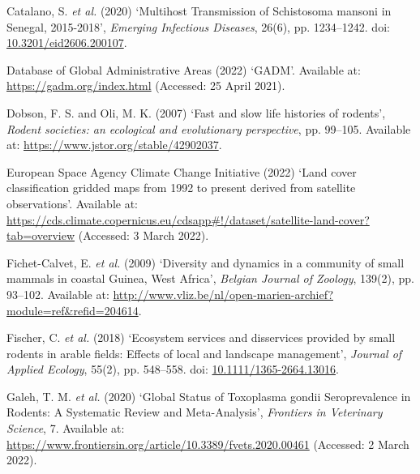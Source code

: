 \documentclass[
]{article}
\newlength{\cslhangindent}
\newlength{\cslentryspacingunit} %
\newenvironment{CSLReferences}[2] %
 {%
  \setlength{\parindent}{0pt}
  \ifodd #1
  \let\oldpar\par
  \def\par{\hangindent=\cslhangindent\oldpar}
  \fi
  \setlength{\parskip}{#2\cslentryspacingunit}
 }%
 {}
\begin{document}
\begin{CSLReferences}{0}{0}
\leavevmode{}%
Catalano, S. \emph{et al.} (2020) {`Multihost {Transmission} of
{Schistosoma} mansoni in {Senegal}, 2015-2018'}, \emph{Emerging
Infectious Diseases}, 26(6), pp. 1234--1242. doi:
\href{https://doi.org/10.3201/eid2606.200107}{10.3201/eid2606.200107}.

\leavevmode{}%
Database of Global Administrative Areas (2022) {`{GADM}'}. Available at:
\url{https://gadm.org/index.html} (Accessed: 25 April 2021).

\leavevmode{}%
Dobson, F. S. and Oli, M. K. (2007) {`Fast and slow life histories of
rodents'}, \emph{Rodent societies: an ecological and evolutionary
perspective}, pp. 99--105. Available at:
\url{https://www.jstor.org/stable/42902037}.

\leavevmode{}%
European Space Agency Climate Change Initiative (2022) {`Land cover
classification gridded maps from 1992 to present derived from satellite
observations'}. Available at:
\url{https://cds.climate.copernicus.eu/cdsapp\#!/dataset/satellite-land-cover?tab=overview}
(Accessed: 3 March 2022).

\leavevmode{}%
Fichet-Calvet, E. \emph{et al.} (2009) {`Diversity and dynamics in a
community of small mammals in coastal {Guinea}, {West} {Africa}'},
\emph{Belgian Journal of Zoology}, 139(2), pp. 93--102. Available at:
\url{http://www.vliz.be/nl/open-marien-archief?module=ref\&refid=204614}.

\leavevmode{}%
Fischer, C. \emph{et al.} (2018) {`Ecosystem services and disservices
provided by small rodents in arable fields: {Effects} of local and
landscape management'}, \emph{Journal of Applied Ecology}, 55(2), pp.
548--558. doi:
\href{https://doi.org/10.1111/1365-2664.13016}{10.1111/1365-2664.13016}.

\leavevmode{}%
Galeh, T. M. \emph{et al.} (2020) {`Global {Status} of {Toxoplasma}
gondii {Seroprevalence} in {Rodents}: {A} {Systematic} {Review} and
{Meta}-{Analysis}'}, \emph{Frontiers in Veterinary Science}, 7.
Available at:
\url{https://www.frontiersin.org/article/10.3389/fvets.2020.00461}
(Accessed: 2 March 2022).


\end{CSLReferences}
\end{document}
